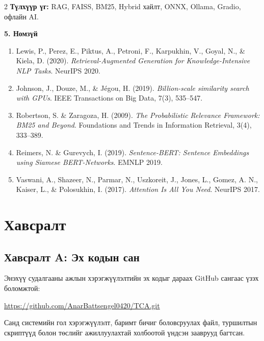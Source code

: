\documentclass[11pt,a4paper]{article}
\newcommand{\addtotoc}[1]{\addcontentsline{toc}{section}{#1}}
\begin{document}
\begin{multicols*}{2}
\noindent\textbf{Түлхүүр үг:} RAG, FAISS, BM25, Hybrid хайлт, ONNX, Ollama, Gradio, офлайн AI.

\noindent\textbf{5. Номзүй}

\begin{enumerate}
      \item Lewis, P., Perez, E., Piktus, A., Petroni, F., Karpukhin, V., Goyal, N., \& Kiela, D. (2020). \textit{Retrieval-Augmented Generation for Knowledge-Intensive NLP Tasks}. NeurIPS 2020.
      \item Johnson, J., Douze, M., \& J\'egou, H. (2019). \textit{Billion-scale similarity search with GPUs}. IEEE Transactions on Big Data, 7(3), 535--547.
      \item Robertson, S. \& Zaragoza, H. (2009). \textit{The Probabilistic Relevance Framework: BM25 and Beyond}. Foundations and Trends in Information Retrieval, 3(4), 333--389.
      \item Reimers, N. \& Gurevych, I. (2019). \textit{Sentence-BERT: Sentence Embeddings using Siamese BERT-Networks}. EMNLP 2019.
      \item Vaswani, A., Shazeer, N., Parmar, N., Uszkoreit, J., Jones, L., Gomez, A. N., Kaiser, L., \& Polosukhin, I. (2017). \textit{Attention Is All You Need}. NeurIPS 2017.
\end{enumerate}

\end{multicols*}
\fi

\newpage
\section*{Хавсралт}
\addtotoc{Хавсралт}

\subsection*{Хавсралт A: Эх кодын сан}
Энэхүү судалгааны ажлын хэрэгжүүлэлтийн эх кодыг дараах GitHub сангаас үзэх боломжтой:

\url{https://github.com/AnarBattsengel0420/TCA.git}

Санд системийн гол хэрэгжүүлэлт, баримт бичиг боловсруулах файл, туршилтын скриптүүд болон төслийг ажиллуулахтай холбоотой үндсэн зааврууд багтсан.
\end{document}
